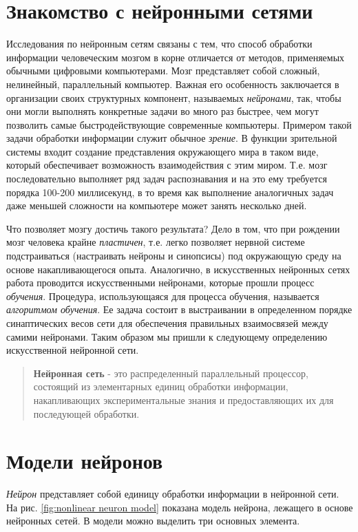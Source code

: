 \documentclass[a4paper,12pt]{report}
\begin{document}
\section{Знакомство с нейронными сетями}
Исследования по нейронным сетям связаны с тем, что способ обработки
информации человеческим мозгом в корне отличается от методов,
применяемых обычными цифровыми компьютерами. Мозг представляет собой
сложный, нелинейный, параллельный компьютер. Важная его особенность
заключается в организации своих структурных компонент, называемых
\textit{нейронами}, так, чтобы они могли выполнять конкретные задачи
во много раз быстрее, чем могут позволить самые быстродействующие
современные компьютеры. Примером такой задачи обработки информации
служит обычное \textit{зрение}. В функции зрительной системы входит
создание представления окружающего мира в таком виде, который
обеспечивает возможность взаимодействия с этим миром. Т.е. мозг
последовательно выполняет ряд задач распознавания и на это ему
требуется порядка 100-200 миллисекунд, в то время как выполнение
аналогичных задач даже меньшей сложности на компьютере может занять
несколько дней.

Что позволяет мозгу достичь такого результата? Дело в том, что
при рождении мозг человека крайне \textit{пластичен}, т.е. легко позволяет
нервной системе подстраиваться (настраивать нейроны и синопсисы) под окружающую среду на основе
накапливающегося опыта. Аналогично, в искусственных нейронных сетях
работа проводится искусственными нейронами, которые прошли процесс
\textit{обучения}. Процедура, использующаяся для процесса обучения,
называется \textit{алгоритмом обучения}. Ее задача состоит в
выстраивании в определенном порядке синаптических весов сети для
обеспечения правильных взаимосвязей между самими нейронами. Таким
образом мы пришли к следующему определению искусственной нейронной
сети.

\begin{quote}
    \textbf{Нейронная сеть} - это распределенный параллельный
    процессор, состоящий из элементарных единиц обработки информации,
    накапливающих экспериментальные знания и предоставляющих их для
    последующей обработки.
\end{quote}

\section{Модели нейронов}
\label{sec:neuron models}
\textit{Нейрон} представляет собой единицу обработки информации в
нейронной сети. На рис. \ref{fig:nonlinear neuron model} показана модель нейрона, лежащего в
основе нейронных сетей. В модели можно выделить три основных элемента.
\end{document}
